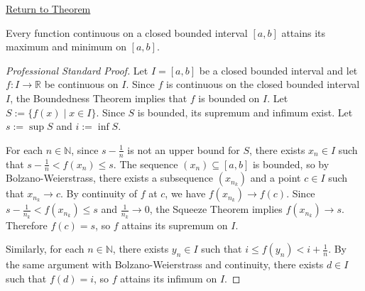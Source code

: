\newpage
{}
\label{prf:maximum-minimum-theorem}

\begin{remark*}[Return]
\hyperref[thm:maximum-minimum-theorem]{Return to Theorem}
\end{remark*}

\begin{theorem*}
Every function continuous on a closed bounded interval $[a,b]$ attains its maximum and minimum on $[a,b]$.
\end{theorem*}

\begin{proof}[Professional Standard Proof]
\LRAProofBodyStart
Let $I=[a,b]$ be a closed bounded interval and let $f : I \to \mathbb{R}$ be continuous on $I$. Since $f$ is continuous on the closed bounded interval $I$, the Boundedness Theorem implies that $f$ is bounded on $I$. Let $S:=\{f(x)\mid x\in I\}$. Since $S$ is bounded, its supremum and infimum exist. Let $s := \sup S$ and $i := \inf S$.

For each $n\in\mathbb{N}$, since $s-\frac{1}{n}$ is not an upper bound for $S$, there exists $x_n\in I$ such that $s-\frac{1}{n}<f(x_n)\le s$. The sequence $(x_n)\subseteq[a,b]$ is bounded, so by Bolzano-Weierstrass, there exists a subsequence $(x_{n_k})$ and a point $c\in I$ such that $x_{n_k}\to c$. By continuity of $f$ at $c$, we have $f(x_{n_k})\to f(c)$. Since $s-\frac{1}{n_k}<f(x_{n_k})\le s$ and $\frac{1}{n_k}\to 0$, the Squeeze Theorem implies $f(x_{n_k})\to s$. Therefore $f(c)=s$, so $f$ attains its supremum on $I$.

Similarly, for each $n\in\mathbb{N}$, there exists $y_n\in I$ such that $i\le f(y_n)<i+\frac{1}{n}$. By the same argument with Bolzano-Weierstrass and continuity, there exists $d\in I$ such that $f(d)=i$, so $f$ attains its infimum on $I$.
\end{proof}

